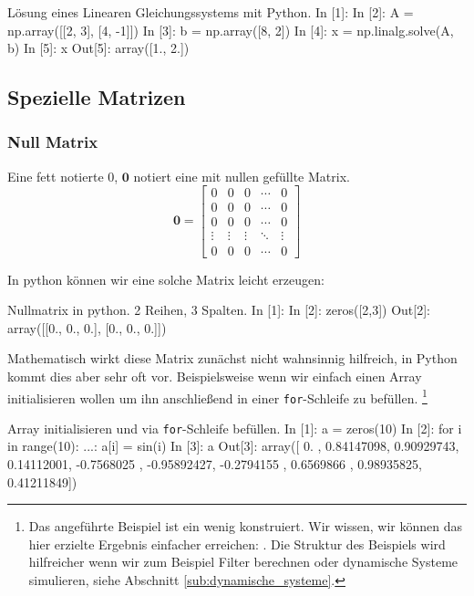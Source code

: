 \begin{python}{Lösung eines Linearen Gleichungssystems mit Python.}
In [1]: %
In [2]: A = np.array([[2, 3], [4, -1]])
In [3]: b = np.array([8, 2])
In [4]: x = np.linalg.solve(A, b)
In [5]: x
Out[5]: array([1., 2.])
\end{python}








\subsection{Spezielle Matrizen}

\subsubsection*{Null Matrix}
Eine fett notierte 0, $\mathbf{0}$ notiert eine mit nullen gefüllte Matrix.
\begin{equation}
\mathbf{0} =
\begin{bmatrix}
0 & 0 & 0 & \cdots & 0 \\
0 & 0 & 0 & \cdots & 0 \\
0 & 0 & 0 & \cdots & 0 \\
\vdots & \vdots & \vdots & \ddots & \vdots \\
0 & 0 & 0 & \cdots & 0
\end{bmatrix}
\end{equation} 

In python können wir eine solche Matrix leicht erzeugen:
\begin{python}{Nullmatrix in python. 2 Reihen, 3 Spalten.}
In [1]: %
In [2]: zeros([2,3])
Out[2]:
array([[0., 0., 0.],
       [0., 0., 0.]])
\end{python}

Mathematisch wirkt diese Matrix zunächst nicht wahnsinnig hilfreich, in Python kommt dies aber sehr oft vor. Beispielsweise wenn wir einfach einen Array initialisieren wollen um ihn anschließend in einer \texttt{for}-Schleife zu befüllen. \footnote{Das angeführte Beispiel ist ein wenig konstruiert. Wir wissen, wir können das hier erzielte Ergebnis einfacher erreichen: . Die Struktur des Beispiels wird hilfreicher wenn wir zum Beispiel Filter berechnen oder dynamische Systeme simulieren, siehe Abschnitt \ref{sub:dynamische_systeme}.}

\begin{python}{Array initialisieren und via \texttt{for}-Schleife befüllen.}
In [1]: a = zeros(10)
In [2]: for i in range(10):
   ...:     a[i] = sin(i)
In [3]: a
Out[3]:
array([ 0.        ,  0.84147098,  0.90929743,  0.14112001, -0.7568025 ,
       -0.95892427, -0.2794155 ,  0.6569866 ,  0.98935825,  0.41211849])
\end{python}

